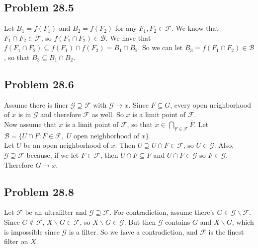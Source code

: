 \documentclass{article}
\newcommand{\F}{\mathcal{F}}
\newcommand{\G}{\mathcal{G}}
\newcommand{\B}{\mathcal{B}}
\newcommand{\minus}{\backslash}
\begin{document}
\subsection*{Problem 28.5}
Let $B_1 = f(F_1)$ and $B_2 = f(F_2)$ for any $F_1, F_2 \in \F$. We know that $F_1 \cap F_2 \in \F$, so $f(F_1 \cap F_2) \in \B$. We have that $f(F_1 \cap F_2) \subseteq f(F_1) \cap f(F_2) = B_1 \cap B_2$. So we can let $B_3 = f(F_1 \cap F_2) \in \B$, so that $B_3 \subseteq B_1 \cap B_2$.

\subsection*{Problem 28.6}
Assume there is finer $\G \supseteq \F$ with $\G \to x$. Since 
$F \subseteq G$, every open neighborhood of $x$ is in $\G$ and therefore $\F$ as well. So $x$ is a limit point of $\F$. \\

Now assume that $x$ is a limit point of $\F$, so that $x \in \bigcap_{F \in \F} \overline{F}$. Let $\B = \{U \cap F : F \in \F, \;U \text{ open neighborhood of } x\}$. \\

Let $U$ be an open neighborhood of $x$. Then $U \supseteq U \cap F \in \F$, so $U \in \G$. Also, $\G \supseteq \F$ because, if we let $F \in \F$, then $U \cap F \subseteq F$ and $U \cap F \in \G$ so $F \in \G$. Therefore $G \to x$.

\subsection*{Problem 28.8}
Let $\F$ be an ultrafilter and $\G \supseteq \F$. For contradiction, assume there's $G \in \G \minus \F$. Since $G \notin \F$, $X \minus G \in \F$, so $X \minus G \in \G$. But then $\G$ contains $G$ and $X \minus G$, which is impossible since $\G$ is a filter. So we have a contradiction, and $\F$ is the finest filter on $X$.
\end{document}

